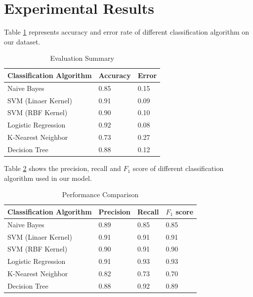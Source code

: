 \section{\textbf{Experimental Results}}
Table \ref{AE} represents accuracy and error rate of different classification algorithm on our dataset.
\renewcommand{\arraystretch}{1.5}
\begin{table}[h!]
\begin{center}
\caption{Evaluation Summary}
\begin{tabular}{|m{4.5cm} | m{1.6cm}| m{1.6cm}|}
\hline
     Classification Algorithm & Accuracy  & Error  \\
\hline
    Naive Bayes & 0.85 & 0.15\\
\hline 
    SVM (Linaer Kernel) & 0.91 & 0.09\\
\hline 
    SVM (RBF Kernel) & 0.90 & 0.10\\
\hline 
    Logistic Regression & 0.92 & 0.08\\
\hline
    K-Nearest Neighbor & 0.73 & 0.27\\
\hline
    Decision Tree & 0.88 & 0.12\\
\hline
\end{tabular}
\label{AE}
\end{center}
\end{table}
\par
Table \ref{prr} shows the precision, recall and $F_1$ score of different classification algorithm used in our model.

\begin{table}[h!]
\begin{center}
\caption{Performance Comparison}
\begin{tabular}{|m{3.6cm} | m{1.25cm}| m{1.2cm}| m{1.3cm}|}
\hline
     Classification Algorithm & Precision & Recall & $F_1$ score \\
\hline
    Naive Bayes & 0.89 & 0.85 & 0.85\\
\hline 
    SVM (Linaer Kernel) & 0.91 & 0.91 & 0.91\\
\hline 
    SVM (RBF Kernel) & 0.90 & 0.91 & 0.90\\
\hline 
    Logistic Regression & 0.91 & 0.93 & 0.93\\
\hline
    K-Nearest Neighbor & 0.82 & 0.73 & 0.70\\
\hline
    Decision Tree & 0.88 & 0.92 & 0.89\\
\hline
\end{tabular}
\label{prr}
\end{center}
\end{table}

